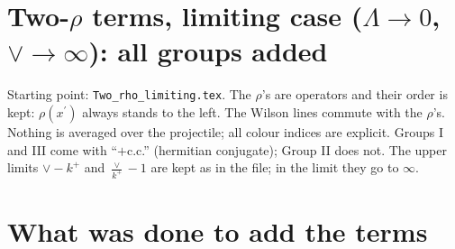 \documentclass[10pt]{article}
\numberwithin{equation}{section}
\begin{document}
\section*{Two-$\rho$ terms, limiting case ($\Lambda\to0$, $\vee\to\infty$): all groups added}
\noindent Starting point: \texttt{Two\_rho\_limiting.tex}. The $\rho$'s are operators and their order is kept: $\rho(x^{\prime})$ always stands to the left. The Wilson lines commute with the $\rho$'s. Nothing is averaged over the projectile; all colour indices are explicit. Groups I and III come with ``$+$c.c.'' (hermitian conjugate); Group II does not. The upper limits $\vee-k^{+}$ and $\frac{\vee}{k^{+}}-1$ are kept as in the file; in the limit they go to $\infty$.

\section{What was done to add the terms}
\end{document}
